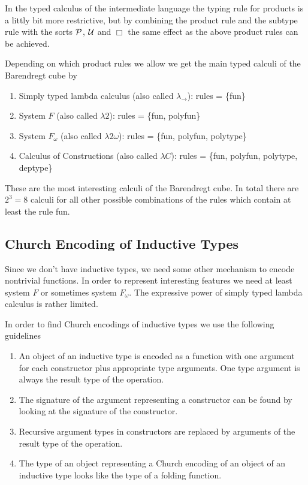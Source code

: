 In the typed calculus of the intermediate language the typing rule for
products is a littly bit more restrictive, but by combining the product rule
and the subtype rule with the sorts ${\cal{P}}$, ${\cal{U}}$ and $\Box$ the same effect
as the above product rules can be achieved.

Depending on which product rules we allow we get the main typed calculi of the
Barendregt cube by
\begin{enumerate}
\item Simply typed lambda calculus (also called $\lambda_\to$): rules =
  \{fun\}

\item System $F$ (also called $\lambda 2$): rules = \{fun, polyfun\}

\item System $F_\omega$ (also called $\lambda 2\omega$): rules = \{fun,
  polyfun, polytype\}

\item Calculus of Constructions (also called $\lambda C$): rules = \{fun,
  polyfun, polytype, deptype\}
\end{enumerate}

These are the most interesting calculi of the Barendregt cube. In total there
are $2^3 = 8$ calculi for all other possible combinations of the rules which
contain at least the rule fun.





\subsection{Church Encoding of Inductive Types}

Since we don't have inductive types, we need some other mechanism to encode
nontrivial functions. In order to represent interesting features we need at
least system $F$ or sometimes system $F_\omega$. The expressive power of
simply typed lambda calculus is rather limited.

In order to find Church encodings of inductive types we use the following
guidelines
\begin{enumerate}
\item An object of an inductive type is encoded as a function with one
  argument for each constructor plus appropriate type arguments. One type
  argument is always the result type of the operation.

\item The signature of the argument representing a constructor can be found by
  looking at the signature of the constructor.

\item Recursive argument types in constructors are replaced by arguments of
  the result type of the operation.

\item The type of an object representing a Church encoding of an object of an
  inductive type looks like the type of a folding function.
\end{enumerate}



